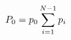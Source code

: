 \documentclass[preview]{standalone}
\begin{document}
\begin{align*}
\special{dvisvgm:raw <g id='unique000'>}P_0 = p_0 \sum_{i=1}^{N-1} p_i\special{dvisvgm:raw </g>}
\end{align*}
\end{document}

